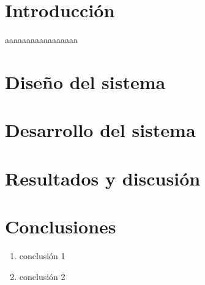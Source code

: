 
%




\section{Introducción}
\label{intro}
aaaaaaaaaaaaaaaaa


\section{Diseño del sistema}
\label{design}




\section{Desarrollo del sistema}
\label{development}



\section{Resultados y discusión}
\label{results}




\section{Conclusiones}
\label{conclusiones}

\begin{enumerate}
    \item conclusión 1
    \item conclusión 2
\end{enumerate}